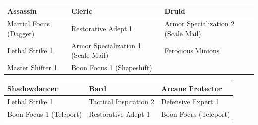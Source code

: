 \documentclass[12pt]{report}
\begin{document}
\begin{longtable}[c]{@{}lll@{}}
\toprule
\begin{minipage}[b]{0.03\columnwidth}\raggedright\strut
Assassin
\strut\end{minipage} &
\begin{minipage}[b]{0.03\columnwidth}\raggedright\strut
Cleric
\strut\end{minipage} &
\begin{minipage}[b]{0.03\columnwidth}\raggedright\strut
Druid
\strut\end{minipage}\tabularnewline
\midrule
\endhead
\begin{minipage}[t]{0.03\columnwidth}\raggedright\strut
Martial Focus (Dagger)
\strut\end{minipage} &
\begin{minipage}[t]{0.03\columnwidth}\raggedright\strut
Restorative Adept 1
\strut\end{minipage} &
\begin{minipage}[t]{0.03\columnwidth}\raggedright\strut
Armor Specialization 2 (Scale Mail)
\strut\end{minipage}\tabularnewline
\begin{minipage}[t]{0.03\columnwidth}\raggedright\strut
Lethal Strike 1
\strut\end{minipage} &
\begin{minipage}[t]{0.03\columnwidth}\raggedright\strut
Armor Specialization 1 (Scale Mail)
\strut\end{minipage} &
\begin{minipage}[t]{0.03\columnwidth}\raggedright\strut
Ferocious Minions
\strut\end{minipage}\tabularnewline
\begin{minipage}[t]{0.03\columnwidth}\raggedright\strut
Master Shifter 1
\strut\end{minipage} &
\begin{minipage}[t]{0.03\columnwidth}\raggedright\strut
Boon Focus 1 (Shapeshift)
\strut\end{minipage} &
\begin{minipage}[t]{0.03\columnwidth}\raggedright\strut
\strut\end{minipage}\tabularnewline
\bottomrule
\end{longtable}

\begin{longtable}[c]{@{}lll@{}}
\toprule
Shadowdancer & Bard & Arcane Protector\tabularnewline
\midrule
\endhead
Lethal Strike 1 & Tactical Inspiration 2 & Defensive Expert
1\tabularnewline
Boon Focus 1 (Teleport) & Restorative Adept 1 & Boon Focus
(Teleport)\tabularnewline
\bottomrule
\end{longtable}
\end{document}
